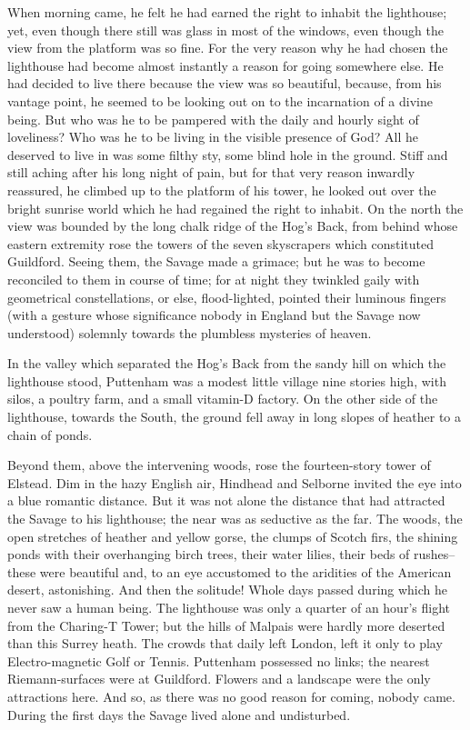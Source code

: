 \documentclass[12pt]{report}
\begin{document}
When morning came, he felt he had earned the right to inhabit the
lighthouse; yet, even though there still was glass in most of the
windows, even though the view from the platform was so fine. For the
very reason why he had chosen the lighthouse had become almost instantly
a reason for going somewhere else. He had decided to live there because
the view was so beautiful, because, from his vantage point, he seemed to
be looking out on to the incarnation of a divine being. But who was he
to be pampered with the daily and hourly sight of loveliness? Who was he
to be living in the visible presence of God? All he deserved to live in
was some filthy sty, some blind hole in the ground. Stiff and still
aching after his long night of pain, but for that very reason inwardly
reassured, he climbed up to the platform of his tower, he looked out
over the bright sunrise world which he had regained the right to
inhabit. On the north the view was bounded by the long chalk ridge of
the Hog's Back, from behind whose eastern extremity rose the towers of
the seven skyscrapers which constituted Guildford. Seeing them, the
Savage made a grimace; but he was to become reconciled to them in course
of time; for at night they twinkled gaily with geometrical
constellations, or else, flood-lighted, pointed their luminous fingers
(with a gesture whose significance nobody in England but the Savage now
understood) solemnly towards the plumbless mysteries of heaven.

In the valley which separated the Hog's Back from the sandy hill on
which the lighthouse stood, Puttenham was a modest little village nine
stories high, with silos, a poultry farm, and a small vitamin-D factory.
On the other side of the lighthouse, towards the South, the ground fell
away in long slopes of heather to a chain of ponds.

Beyond them, above the intervening woods, rose the fourteen-story tower
of Elstead. Dim in the hazy English air, Hindhead and Selborne invited
the eye into a blue romantic distance. But it was not alone the distance
that had attracted the Savage to his lighthouse; the near was as
seductive as the far. The woods, the open stretches of heather and
yellow gorse, the clumps of Scotch firs, the shining ponds with their
overhanging birch trees, their water lilies, their beds of rushes--these
were beautiful and, to an eye accustomed to the aridities of the
American desert, astonishing. And then the solitude! Whole days passed
during which he never saw a human being. The lighthouse was only a
quarter of an hour's flight from the Charing-T Tower; but the hills of
Malpais were hardly more deserted than this Surrey heath. The crowds
that daily left London, left it only to play Electro-magnetic Golf or
Tennis. Puttenham possessed no links; the nearest Riemann-surfaces were
at Guildford. Flowers and a landscape were the only attractions here.
And so, as there was no good reason for coming, nobody came. During the
first days the Savage lived alone and undisturbed.
\end{document}
